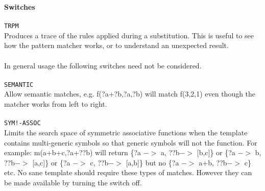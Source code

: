 \documentclass{article}
\begin{document}
{\bf Switches} \\
\ \\
{\tt TRPM} \\
Produces a trace of the rules applied during a substitution. This is
useful to see how the pattern matcher works, or to understand an
unexpected result. \\
\ \\
In general usage the following switches need not be considered. \\
\ \\
{\tt SEMANTIC} \\
Allow semantic matches, e.g. f(?a+?b,?a,?b) will match f(3,2,1) even
though the matcher works from left to right. \\
\ \\
{\tt SYM!-ASSOC} \\
Limits the search space of symmetric associative functions when the
template contains multi-generic symbols so that generic symbols will not
the function. For example: m(a+b+c,?a+??b) will return \{?a $->$ a, ??b$->$
{[}b,c{]}\} or \{?a $->$ b, ??b$->$ {[}a,c{]}\} or \{?a $->$ c, ??b$->$ {[}a,b{]}\}
but no \{?a $->$ a+b, ??b$->$ c\} etc. No sane template should require these 
types of matches. However they can be made available by turning the switch off.
\end{document}
